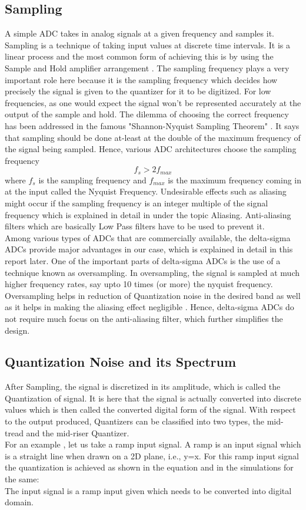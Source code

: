 \documentclass[colorlinks=true,pdfstartview=FitV,linkcolor=blue,
            citecolor=red,urlcolor=magenta]{ligodoc}
\begin{document}
\subsection{Sampling} A simple ADC takes in analog signals at a given frequency and samples it. Sampling is a technique of taking input values at discrete time intervals. It is a linear process and the most common form of achieving this is by using the Sample and Hold amplifier arrangement \cite{Oppenheim}. The sampling frequency plays a very important role here because it is the sampling frequency which decides how precisely the signal is given to the quantizer for it to be digitized. For low frequencies, as one would expect the signal won't be represented accurately at the output of the sample and hold. The dilemma of choosing the correct frequency has been addressed in the famous "Shannon-Nyquist Sampling Theorem" \cite{Oppenheim}. It says that sampling should be done at-least at the double of the maximum frequency of the signal being sampled. Hence, various ADC architectures choose the sampling frequency
 \begin{equation}
 f_{s}>2f_{max}
 \end{equation}
 where $f_{s}$ is the sampling frequency and $f_{max}$ is the maximum frequency coming in at the input called the Nyquist Frequency.
 Undesirable effects such as aliasing might occur if the sampling frequency is an integer multiple of the signal frequency which is explained in detail in \cite{Oppenheim} under the topic Aliasing. Anti-aliasing filters which are basically Low Pass filters have to be used to prevent it.\\
Among various types of ADCs that are commercially available, the delta-sigma ADCs provide major advantages in our case, which is explained in detail in this report later. One of the important parts of delta-sigma ADCs is the use of a technique known as oversampling. In oversampling, the signal is sampled at much higher frequency rates, say upto 10 times (or more) the nyquist frequency. Oversampling helps in reduction of Quantization noise in the desired band as well as it helps in making the aliasing effect negligible \cite{Basic_Sigma}. Hence, delta-sigma ADCs do not require much focus on the anti-aliasing filter, which further simplifies the design.
 \subsection{Quantization Noise and its Spectrum}
 After Sampling, the signal is discretized in its amplitude, which is called the Quantization of signal. It is here that the signal is actually converted into discrete values which is then called the converted digital form of the signal.
 With respect to the output produced, Quantizers can be classified into two types, the mid-tread and the mid-riser Quantizer.\\
 For an example \cite{Wikipedia}, let us take a ramp input signal. A ramp is an input signal which is a straight line when drawn on a 2D plane, i.e., y=x. For this ramp input signal the quantization is achieved as shown in the equation and in the simulations for the same:\\
 The input signal is a ramp input given which needs to be converted into digital domain.
\end{document}

